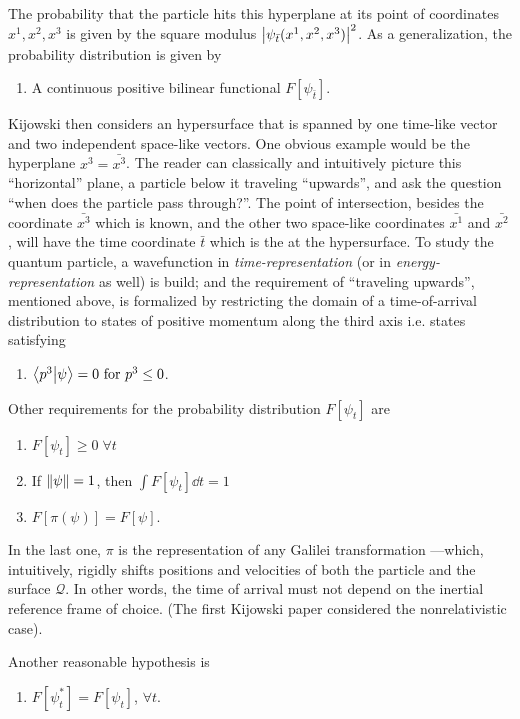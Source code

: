 The probability that the particle hits this hyperplane at its point of coordinates $x^1, x^2, x^3$
is given by the square modulus $\abs{\psi_{\bar{t}}(x^1, x^2, x^3)}^2$. As a generalization,
the probability distribution is given by
\begin{enumerate}
  \item A continuous positive bilinear functional $F[\psi_{\bar{t}}]$.
\end{enumerate}

Kijowski then considers an hypersurface that is spanned by one time-like vector and two independent
space-like vectors. One obvious example would be the hyperplane $x^3 = \bar{x^3}$.
The reader can classically and intuitively picture this ``horizontal'' plane,
a particle below it traveling ``upwards'', and ask the question
``when does the particle pass through?''. The point of intersection,
besides the coordinate $\bar{x^3}$ which is known, and the other two space-like coordinates $\bar{x^1}$ and $\bar{x^2}$,
will have the time coordinate $\bar{t}$ which is the  at the hypersurface.
To study the quantum particle, a wavefunction in \emph{time-representation}
(or in \emph{energy-representation} as well) is build;
and the requirement of ``traveling upwards'',
mentioned above, is formalized by restricting the domain of a time-of-arrival
distribution to states of positive momentum along the third axis i.e. states satisfying
\begin{enumerate}[resume]
  \item $\braket{p^3}{\psi} = 0 \text{ for } p^3 \leq 0$.
\end{enumerate}

Other requirements for the probability distribution $F[\psi_t]$ are
\begin{enumerate}[resume]
  \item $F[\psi_t] \ge 0 \; \forall t$
  \item If $\norm{\psi} = 1$, then $\int F[\psi_t] \dd t = 1$
  \item $F[\pi(\psi)] = F[\psi]$.
\end{enumerate}
In the last one, $\pi$
is the representation of any Galilei transformation ---which, intuitively, rigidly shifts
positions and velocities of both the particle and the surface $\mathcal{Q}$. In other words,
the time of arrival must not depend on the inertial reference frame of choice.
(The first Kijowski paper considered the nonrelativistic case).

Another reasonable hypothesis is
\begin{enumerate}[resume]
  \item $F[\psi^{*}_t] = F[\psi_t]$, $\forall t$.
\end{enumerate}

